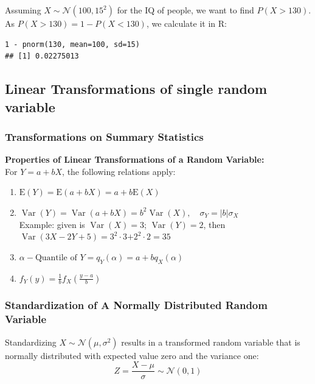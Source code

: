 \documentclass[11pt]{article}
\newcommand*\N[1]{\mathcal{N}\left(#1\right)}
\begin{document}
Assuming $X \sim \N{100, 15^2}$ for the IQ of people, we want to find $P(X > 130)$.
As $P(X > 130) = 1 - P(X < 130)$, we calculate it in R:
\begin{verbatim}
1 - pnorm(130, mean=100, sd=15)
## [1] 0.02275013
\end{verbatim}

\subsection{Linear Transformations of single random variable}

\subsubsection{Transformations on Summary Statistics}
\begin{definition}
	\textbf{Properties of Linear Transformations of a Random Variable:}\\
	For $Y=a+b X$, the following relations apply:
	\begin{enumerate}[label=(\roman*)]
		\item $\mathrm{E}(Y)=\mathrm{E}(a+b X)=a+b \mathrm{E}(X)$
		\item $\operatorname{Var}(Y)=\operatorname{Var}(a+b X)=b^2 \operatorname{Var}(X), \quad \sigma_Y=|b| \sigma_X$\\
		Example: given is $\operatorname{Var}(X)=3$; $\operatorname{Var}(Y) = 2$, then $\operatorname{Var}(3X-2Y+5)=3^2 \cdot 3 \boldsymbol{+} 2^2 \cdot 2 = 35$ 
		\item $\alpha - \text{Quantile of } Y=q_Y(\alpha)=a+b q_X(\alpha)$
		\item $f_Y(y)=\frac{1}{b} f_X\left(\frac{y-a}{b}\right)$
	\end{enumerate}
\end{definition}

\subsubsection{Standardization of A Normally Distributed Random Variable}
\begin{definition}
	Standardizing $ X\sim\N{\mu,\sigma^2} $ results in a transformed random variable that is normally distributed with expected value zero and the variance one:
	\begin{equation*}
		Z = \frac{X - \mu}{\sigma} \sim \N{0,1}
	\end{equation*}
\end{definition}
\end{document}

